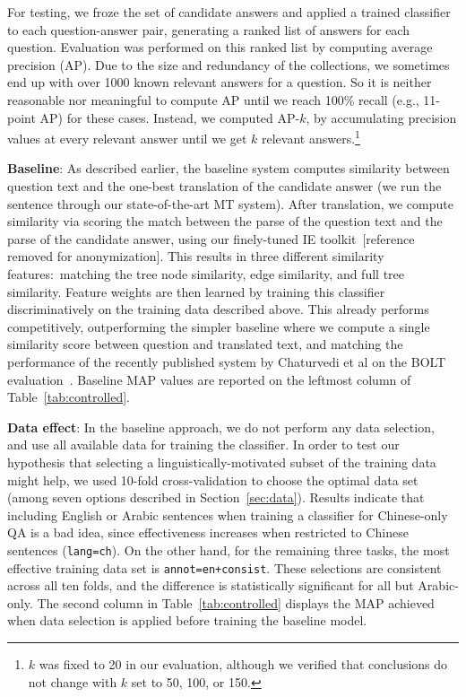 \documentclass{sig-alternate-05-2015}
\newcommand{\red}[1]{\textcolor{red}{#1}}
\begin{document}
For testing, we froze the set of candidate answers and applied a trained classifier to each question-answer pair, generating
a ranked list of answers for each question. Evaluation was performed on this ranked list by computing average precision (AP). 
Due to the size and redundancy of the collections, we sometimes end 
up with over 1000 known relevant answers for a question. So it is neither reasonable nor meaningful to compute AP until we
reach 100\% recall (e.g., 11-point AP) for these cases. Instead, we computed AP-$k$, by accumulating precision values 
at every relevant answer until we get $k$ relevant answers.\footnote{$k$ was fixed to 20 in our evaluation, although we
verified that conclusions do not change with $k$ set to 50, 100, or 150.} %

\textbf{Baseline}: As described earlier, the baseline system computes similarity between question text and the one-best 
translation of the candidate answer (we run the sentence through our state-of-the-art MT system). After translation, we 
compute similarity via scoring the match between the parse of the question text and the parse of the candidate answer, 
using our finely-tuned IE toolkit~[reference removed for anonymization].
This results in three different similarity features:\ matching the tree node similarity, 
edge similarity, and full tree similarity. Feature weights are then learned by training this classifier discriminatively on the 
training data described above. This already performs competitively, outperforming the simpler baseline where we compute 
a single similarity score between question and translated text, and matching the performance of the recently 
published system by Chaturvedi et al on the BOLT evaluation~\cite{Chaturvedi:2014aa}. Baseline MAP values are 
reported on the leftmost column of Table~\ref{tab:controlled}.

\textbf{Data effect}: In the baseline approach, we do not perform any data selection, and use all available data for training the
classifier. In order to test our hypothesis that selecting a linguistically-motivated subset of the training data
might help, we used 10-fold cross-validation to choose the optimal data set (among seven options described in 
Section~\ref{sec:data}). Results indicate that including English or Arabic sentences when training a classifier 
for Chinese-only QA is a bad idea, since effectiveness increases when restricted to Chinese sentences ({\tt lang=ch}).
On the other hand, for the remaining three tasks, the most effective training data set is {\tt annot=en+consist}.
These selections are consistent across all ten folds, and the difference is statistically significant for all but Arabic-only.
The second column in Table~\ref{tab:controlled} displays the MAP achieved when data selection is applied
before training the baseline model.
\end{document}
